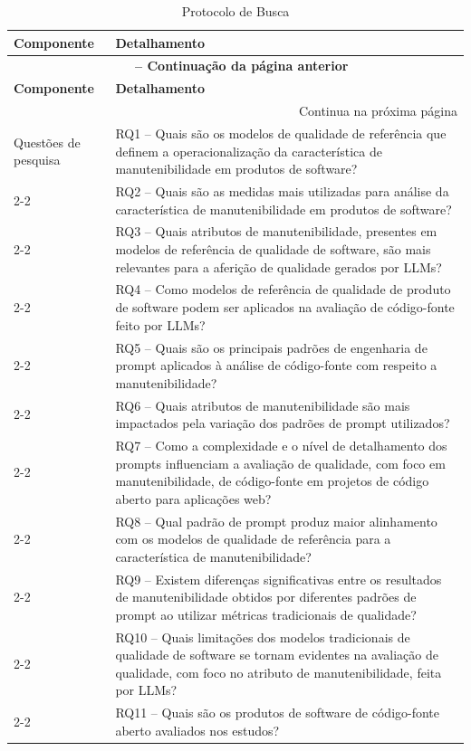 \begin{longtable}{|p{3.5cm}|p{11cm}|}
\caption{Protocolo de Busca} \label{tab:protocolo_busca} \\
\hline
\textbf{Componente} & \textbf{Detalhamento} \\ \hline
\endfirsthead

\multicolumn{2}{c}{{\bfseries \tablename\ \thetable{} -- Continuação da página anterior}} \\ \hline
\textbf{Componente} & \textbf{Detalhamento} \\ \hline
\endhead

\hline \multicolumn{2}{r}{{Continua na próxima página}} \\
\endfoot

\hline
\endlastfoot

Questões de pesquisa & RQ1 -- Quais são os modelos de qualidade de referência que definem a operacionalização da característica de manutenibilidade em produtos de software? \\ \cline{2-2}
 & RQ2 -- Quais são as medidas mais utilizadas para análise da característica de manutenibilidade em produtos de software? \\ \cline{2-2}
 & RQ3 -- Quais atributos de manutenibilidade, presentes em modelos de referência de qualidade de software, são mais relevantes para a aferição de qualidade gerados por LLMs? \\ \cline{2-2}
 & RQ4 -- Como modelos de referência de qualidade de produto de software podem ser aplicados na avaliação de código-fonte feito por LLMs? \\ \cline{2-2}
 & RQ5 -- Quais são os principais padrões de engenharia de prompt aplicados à análise de código-fonte com respeito a manutenibilidade? \\ \cline{2-2}
 & RQ6 -- Quais atributos de manutenibilidade são mais impactados pela variação dos padrões de prompt utilizados? \\ \cline{2-2}
 & RQ7 -- Como a complexidade e o nível de detalhamento dos prompts influenciam a avaliação de qualidade, com foco em manutenibilidade, de código-fonte em projetos de código aberto para aplicações web? \\ \cline{2-2}
 & RQ8 -- Qual padrão de prompt produz maior alinhamento com os modelos de qualidade de referência para a característica de manutenibilidade? \\ \cline{2-2}
 & RQ9 -- Existem diferenças significativas entre os resultados de manutenibilidade obtidos por diferentes padrões de prompt ao utilizar métricas tradicionais de qualidade? \\ \cline{2-2}
 & RQ10 -- Quais limitações dos modelos tradicionais de qualidade de software se tornam evidentes na avaliação de qualidade, com foco no atributo de manutenibilidade, feita por LLMs? \\ \cline{2-2}
 & RQ11 -- Quais são os produtos de software de código-fonte aberto avaliados nos estudos? \\ \hline


\end{longtable}
